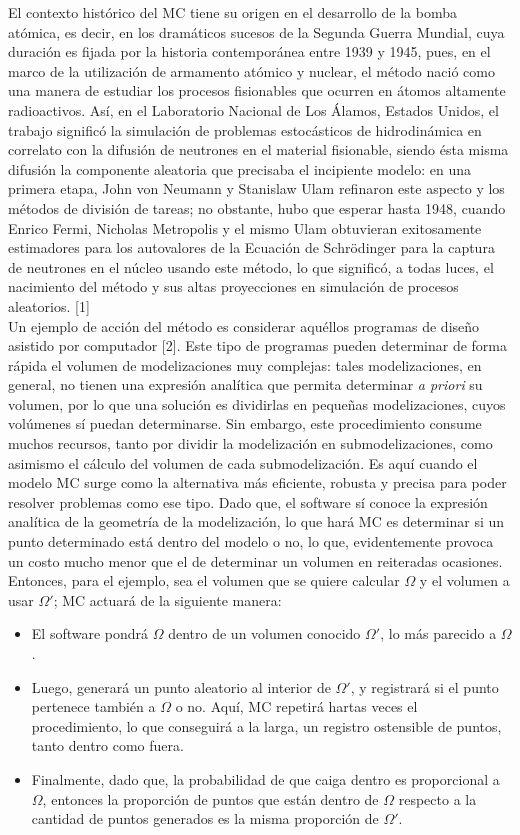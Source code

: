 \documentclass[12pt]{article}
\begin{document}
El contexto histórico del MC tiene su origen en el desarrollo de la bomba atómica, es decir, en los dramáticos sucesos de la Segunda Guerra Mundial, cuya duración es fijada por la historia contemporánea entre 1939 y 1945, pues, en el marco de la utilización de armamento atómico y nuclear, el método nació como una manera de estudiar los procesos fisionables que ocurren en átomos altamente radioactivos. Así, en el Laboratorio Nacional de Los Álamos, Estados Unidos, el trabajo significó la simulación de problemas estocásticos de hidrodinámica en correlato con la difusión de neutrones en el material fisionable, siendo ésta misma difusión la componente aleatoria que precisaba el incipiente modelo: en una primera etapa, John von Neumann y Stanislaw Ulam refinaron este aspecto y los métodos de división de tareas; no obstante, hubo que esperar hasta 1948, cuando Enrico Fermi, Nicholas Metropolis y el mismo Ulam obtuvieran exitosamente estimadores para los autovalores de la Ecuación de Schrödinger para la captura de neutrones en el núcleo usando este método, lo que significó, a todas luces, el nacimiento del método y sus altas proyecciones en simulación de procesos aleatorios. [1] \\

Un ejemplo de acción del método es considerar aquéllos programas de diseño asistido por computador [2]. Este tipo de programas pueden determinar de forma rápida el volumen de modelizaciones muy complejas: tales modelizaciones, en general, no tienen una expresión analítica que permita determinar \emph{a priori} su volumen, por lo que una solución es dividirlas en pequeñas modelizaciones, cuyos volúmenes sí puedan determinarse. Sin embargo, este procedimiento consume muchos recursos, tanto por dividir la modelización en submodelizaciones, como asimismo el cálculo del volumen de cada submodelización. Es aquí cuando el modelo MC surge como la alternativa más eficiente, robusta y precisa para poder resolver problemas como ese tipo. Dado que, el software sí conoce la expresión analítica de la geometría de la modelización, lo que hará MC es determinar si un punto determinado está dentro del modelo o no, lo que, evidentemente provoca un costo mucho menor que el de determinar un volumen en reiteradas ocasiones. Entonces, para el ejemplo, sea el volumen que se quiere calcular $\Omega$ y el volumen a usar $\Omega'$; MC actuará de la siguiente manera:

\begin{itemize}
\item El software pondrá $\Omega$ dentro de un volumen conocido $\Omega'$, lo más parecido a $\Omega$.
\item Luego, generará un punto aleatorio al interior de $\Omega'$, y registrará si el punto pertenece también a $\Omega$ o no. Aquí, MC repetirá hartas veces el procedimiento, lo que conseguirá a la larga, un registro ostensible de puntos, tanto dentro como fuera.
\item Finalmente, dado que, la probabilidad de que caiga dentro es proporcional a $\Omega$, entonces la proporción de puntos que están dentro de $\Omega$ respecto a la cantidad de puntos generados es la misma proporción de $\Omega'$.
\end{itemize}
\end{document}
